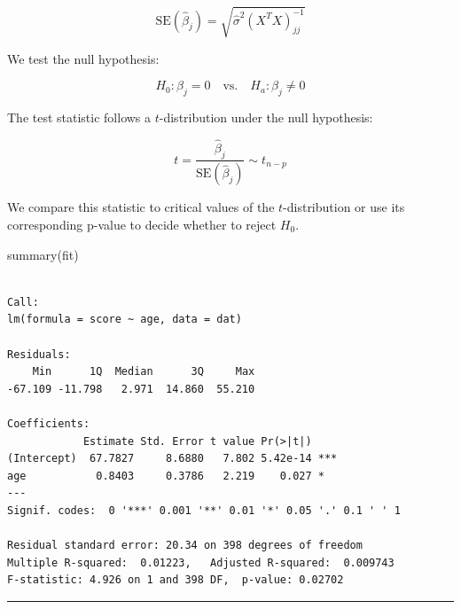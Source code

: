 \documentclass[
  letterpaper,
  DIV=11,
  numbers=noendperiod]{scrreprt}
\newenvironment{Shaded}{\begin{snugshade}}{\end{snugshade}}
\newcommand{\FunctionTok}[1]{\textcolor[rgb]{0.28,0.35,0.67}{#1}}
\newcommand{\NormalTok}[1]{\textcolor[rgb]{0.00,0.23,0.31}{#1}}
\begin{document}
\[
\mathrm{SE}(\hat{\beta}_j) = \sqrt{\hat{\sigma}^2 (X^TX)^{-1}_{jj}}
\]

We test the null hypothesis:

\[
H_0: \beta_j = 0 \quad \text{vs.} \quad H_a: \beta_j \ne 0
\]

The test statistic follows a \(t\)-distribution under the null
hypothesis:

\[
t = \frac{\hat{\beta}_j}{\mathrm{SE}(\hat{\beta}_j)} \sim t_{n - p}
\]

We compare this statistic to critical values of the \(t\)-distribution
or use its corresponding p-value to decide whether to reject \(H_0\).

\begin{Shaded}
\begin{Highlighting}[]
\FunctionTok{summary}\NormalTok{(fit)}
\end{Highlighting}
\end{Shaded}

\begin{verbatim}

Call:
lm(formula = score ~ age, data = dat)

Residuals:
    Min      1Q  Median      3Q     Max 
-67.109 -11.798   2.971  14.860  55.210 

Coefficients:
            Estimate Std. Error t value Pr(>|t|)    
(Intercept)  67.7827     8.6880   7.802 5.42e-14 ***
age           0.8403     0.3786   2.219    0.027 *  
---
Signif. codes:  0 '***' 0.001 '**' 0.01 '*' 0.05 '.' 0.1 ' ' 1

Residual standard error: 20.34 on 398 degrees of freedom
Multiple R-squared:  0.01223,   Adjusted R-squared:  0.009743 
F-statistic: 4.926 on 1 and 398 DF,  p-value: 0.02702
\end{verbatim}

\begin{center}\rule{0.5\linewidth}{0.5pt}\end{center}
\end{document}

